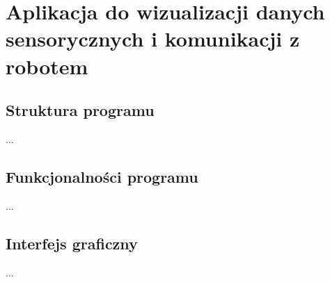 \chapter{Aplikacja do wizualizacji danych sensorycznych i komunikacji z robotem}

\section{Struktura programu}
...

\section{Funkcjonalności programu}
...

\section{Interfejs graficzny}
...